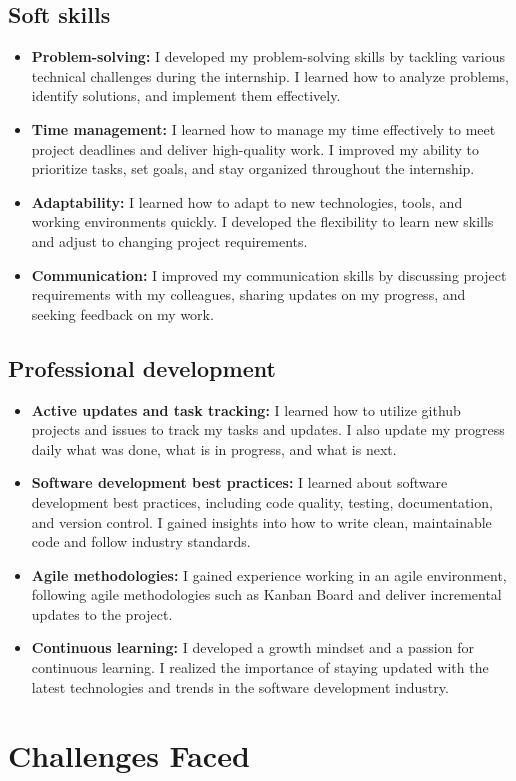 \subsection{Soft skills}
\label{subsec:learning_challenges:soft_skills}

\begin{itemize}
    \item \textbf{Problem-solving:} I developed my problem-solving skills by tackling various technical challenges during the internship. I learned how to analyze problems, identify solutions, and implement them effectively.
    \item \textbf{Time management:} I learned how to manage my time effectively to meet project deadlines and deliver high-quality work. I improved my ability to prioritize tasks, set goals, and stay organized throughout the internship.
    \item \textbf{Adaptability:} I learned how to adapt to new technologies, tools, and working environments quickly. I developed the flexibility to learn new skills and adjust to changing project requirements.
    \item \textbf{Communication:} I improved my communication skills by discussing project requirements with my colleagues, sharing updates on my progress, and seeking feedback on my work.
\end{itemize}

\subsection{Professional development}
\label{subsec:learning_challenges:professional_development}

\begin{itemize}
    \item \textbf{Active updates and task tracking:} I learned how to utilize github projects and issues to track my tasks and updates. I also update my progress daily what was done, what is in progress, and what is next.
    \item \textbf{Software development best practices:} I learned about software development best practices, including code quality, testing, documentation, and version control. I gained insights into how to write clean, maintainable code and follow industry standards.
    \item \textbf{Agile methodologies:} I gained experience working in an agile environment, following agile methodologies such as Kanban Board and deliver incremental updates to the project.
    \item \textbf{Continuous learning:} I developed a growth mindset and a passion for continuous learning. I realized the importance of staying updated with the latest technologies and trends in the software development industry.
\end{itemize}

%
%

\section{Challenges Faced}
\label{sec:learning_challenges:challenges_faced}
